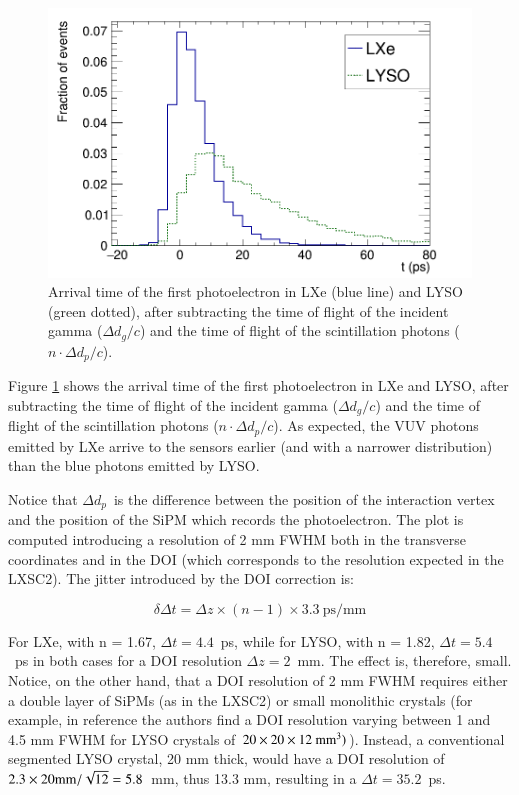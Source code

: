 \documentclass[review]{elsarticle}
\begin{document}
\begin{figure}[!bhtp]
	\centering
	\includegraphics[scale=0.4]{../img/FirstPEScintLXeLYSO.png}
	\caption{\label{fig.firstPE} Arrival time of the first photoelectron in LXe (blue line) and LYSO (green dotted), after subtracting the time of flight of the incident gamma ($\Delta d_g/c$) and the time of flight of the scintillation photons ($n \cdot \Delta d_p/c$). }\label{fig.FirstPE}
\end{figure} 

Figure \ref{fig.FirstPE} shows the arrival time of the first photoelectron in LXe and LYSO, after subtracting the time of flight of the incident gamma ($\Delta d_g/c$) and the time of flight of the scintillation photons ($n \cdot \Delta d_p/c$). As expected, the VUV photons emitted by LXe arrive to the sensors earlier (and with a narrower distribution) than the blue photons emitted by LYSO. 

Notice that $\Delta d_p$~is the difference 
between the position of the interaction vertex and the position of the SiPM which records the photoelectron. 
The plot is computed introducing a resolution of 2 mm FWHM both in the transverse coordinates and
in the DOI (which corresponds to the resolution expected in the LXSC2). The jitter introduced by the DOI correction is:

\begin{equation}
\delta \Delta t =\Delta z \times (n-1) \times 3.3\ \textrm{ps/mm}
\label{eq.DOI}
\end{equation}

For LXe, with n = 1.67, $\Delta t = 4.4$~ps, while for  LYSO, with n = 1.82, $\Delta t = 5.4$~ps in both cases for a DOI resolution $\Delta z = 2$~mm. The effect is, therefore, small. Notice, on the other hand, that a DOI resolution of 2 mm FWHM requires either a double layer of SiPMs (as in the LXSC2) or small monolithic crystals (for example, in reference \cite{VanDamm2011} the authors find a DOI resolution varying between 1 and 4.5 mm FWHM for LYSO crystals of 
$20 \times 20 \times 12 ~{\rm mm^3})$). Instead, a conventional segmented LYSO crystal, 20 mm
thick, would have a DOI resolution of $2.3 \times 20{\rm mm}/\sqrt{12} = 5.8$~mm, thus 13.3 mm, resulting in a $\Delta t = 35.2$~ps.
\end{document}
